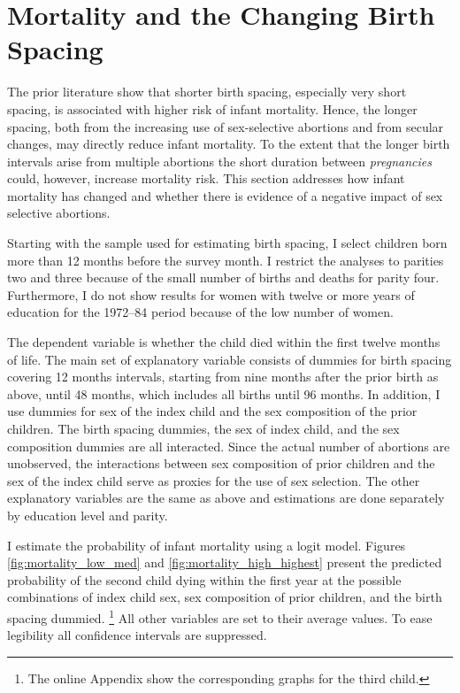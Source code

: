 \documentclass[12pt,letterpaper]{article}
\begin{document}
\section{Mortality and the Changing Birth Spacing\label{sec:mortality}}

The prior literature show that shorter birth spacing, especially very short spacing,
is associated with higher risk of infant mortality.
Hence, the longer spacing, both from the increasing use of sex-selective abortions and
from secular changes, may directly reduce infant mortality.
To the extent that the longer birth intervals arise from multiple abortions
the short duration between \emph{pregnancies} could, however, increase mortality risk.
This section addresses how infant mortality has changed and whether there is evidence
of a negative impact of sex selective abortions.

Starting with the sample used for estimating birth spacing, I select children born 
more than 12 months before the survey month.
I restrict the analyses to parities two and three because of the small number
of births and deaths for parity four.
Furthermore, I do not show results for women with twelve or more years of
education for the 1972--84 period because of the low number of women.

The dependent variable is whether the child died within the first twelve
months of life.
The main set of explanatory variable consists of dummies for birth spacing
covering 12 months intervals, starting from nine months after the prior birth 
as above, until 48 months, which includes all births until 96 months.
In addition, I use dummies for sex of the index child and the sex composition 
of the prior children.
The birth spacing dummies, the sex of index child, and the sex composition dummies
are all interacted.
Since the actual number of abortions are unobserved, the interactions between
sex composition of prior children and the sex of the index child serve
as proxies for the use of sex selection.
The other explanatory variables are the same as above and estimations
are done separately by education level and parity.

I estimate the probability of infant mortality using a logit model.
Figures \ref{fig:mortality_low_med} and \ref{fig:mortality_high_highest} present 
the predicted probability of the second child dying within the first year at the 
possible combinations of index child sex, sex composition of prior children, and 
the birth spacing dummied.%
\footnote{
The online Appendix show the corresponding graphs for the third child.
}
All other variables are set to their average values.
To ease legibility all confidence intervals are suppressed.
\end{document}
